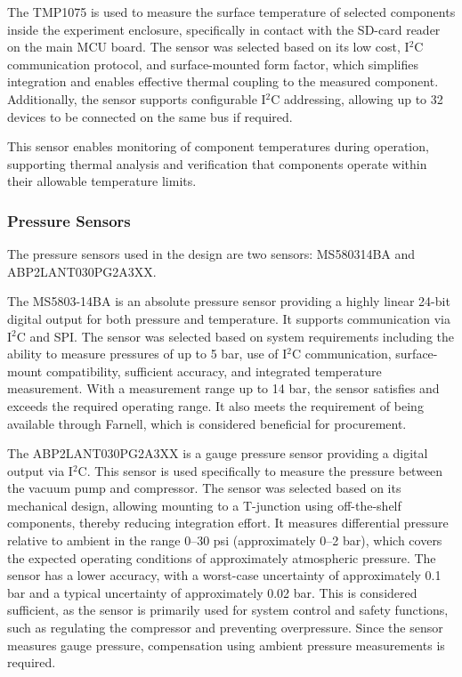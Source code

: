The TMP1075 is used to measure the surface temperature of selected components inside the experiment enclosure, specifically in contact with the SD-card reader on the main MCU board. The sensor was selected based on its low cost, I$^2$C communication protocol, and surface-mounted form factor, which simplifies integration and enables effective thermal coupling to the measured component. Additionally, the sensor supports configurable I$^2$C addressing, allowing up to 32 devices to be connected on the same bus if required.

This sensor enables monitoring of component temperatures during operation, supporting thermal analysis and verification that components operate within their allowable temperature limits.

\subsubsection{Pressure Sensors}

The pressure sensors used in the design are two sensors: MS580314BA and ABP2LANT030PG2A3XX.

The MS5803-14BA is an absolute pressure sensor providing a highly linear 24-bit digital output for both pressure and temperature. It supports communication via I$^2$C and SPI. The sensor was selected based on system requirements including the ability to measure pressures of up to 5 bar, use of I$^2$C communication, surface-mount compatibility, sufficient accuracy, and integrated temperature measurement. With a measurement range up to 14 bar, the sensor satisfies and exceeds the required operating range. It also meets the requirement of being available through Farnell, which is considered beneficial for procurement.

The ABP2LANT030PG2A3XX is a gauge pressure sensor providing a digital output via I$^2$C. This sensor is used specifically to measure the pressure between the vacuum pump and compressor. The sensor was selected based on its mechanical design, allowing mounting to a T-junction using off-the-shelf components, thereby reducing integration effort. It measures differential pressure relative to ambient in the range 0--30 psi (approximately 0--2 bar), which covers the expected operating conditions of approximately atmospheric pressure. The sensor has a lower accuracy, with a worst-case uncertainty of approximately 0.1 bar and a typical uncertainty of approximately 0.02 bar. This is considered sufficient, as the sensor is primarily used for system control and safety functions, such as regulating the compressor and preventing overpressure. Since the sensor measures gauge pressure, compensation using ambient pressure measurements is required.

